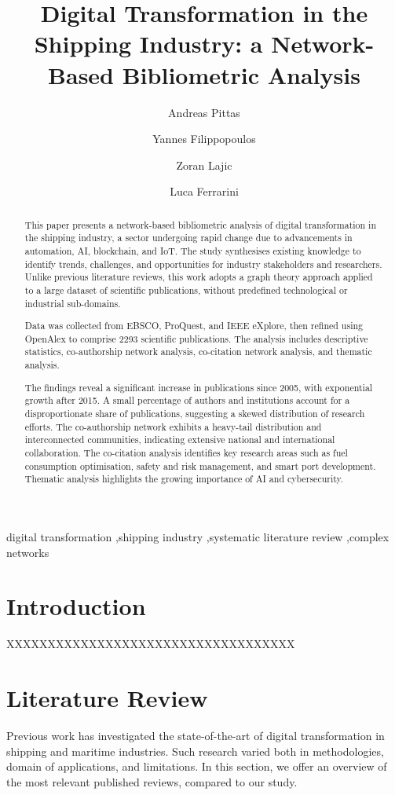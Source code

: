 \documentclass[a4paper, review, endfloat, authoryear]{elsarticle}
\title{Digital Transformation in the Shipping Industry: a Network-Based Bibliometric Analysis}
\author[1]{Andreas Pittas}
\author[1]{Yannes Filippopoulos}
\author[2]{Zoran Lajic}
\author[1]{Luca Ferrarini\corref{cor1}}
\affiliation[1]{organization={Department of Information Technologies, University of Limassol},
	city={Limassol},
	country={Cyprus}}
\affiliation[2]{organization={Department of Energy Efficiency, Angelicoussis Group},
	city={Athens},
	country={Greece}}
\begin{document}
	
	\begin{abstract}
		This paper presents a network-based bibliometric analysis of digital transformation in the shipping industry, a sector undergoing rapid change due to advancements in automation, AI, blockchain, and IoT. The study synthesises existing knowledge to identify trends, challenges, and opportunities for industry stakeholders and researchers. Unlike previous literature reviews, this work adopts a graph theory approach applied to a large dataset of scientific publications, without predefined technological or industrial sub-domains.
		
		Data was collected from EBSCO, ProQuest, and IEEE eXplore, then refined using OpenAlex to comprise 2293 scientific publications. The analysis includes descriptive statistics, co-authorship network analysis, co-citation network analysis, and thematic analysis.
				
		The findings reveal a significant increase in publications since 2005, with exponential growth after 2015. A small percentage of authors and institutions account for a disproportionate share of publications, suggesting a skewed distribution of research efforts. The co-authorship network exhibits a heavy-tail distribution and interconnected communities, indicating extensive national and international collaboration. The co-citation analysis identifies key research areas such as fuel consumption optimisation, safety and risk management, and smart port development. Thematic analysis highlights the growing importance of AI and cybersecurity.
	\end{abstract}
	
	\begin{keyword}
		digital transformation \sep shipping industry \sep systematic literature review \sep complex networks
	\end{keyword}
	
	\maketitle  %
	
	\section{Introduction}
	XXXXXXXXXXXXXXXXXXXXXXXXXXXXXXXXXXX
	
	\section{Literature Review}
	Previous work has investigated the state-of-the-art of digital transformation in shipping and maritime industries. Such research varied both in methodologies, domain of applications, and limitations. In this section, we offer an overview of the most relevant published reviews, compared to our study.
	
\end{document}

